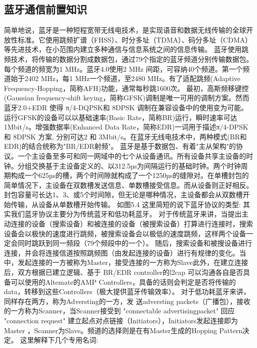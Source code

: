\subsection{蓝牙通信前置知识}
简单地说，蓝牙是一种短程宽带无线电技术，是实现语音和数据无线传输的全球开放性标准。它使用跳频扩谱（FHSS）、时分多址（TDMA）、码分多址（CDMA）等先进技术，在小范围内建立多种通信与信息系统之间的信息传输。
蓝牙使用跳频技术，将传输的数据分割成数据包，通过79个指定的蓝牙频道分别传输数据包。每个频道的频宽为1 MHz。蓝牙4.0使用2 MHz 间距，可容纳40个频道。第一个频道始于2402 MHz，每1 MHz一个频道，至2480 MHz。有了适配跳频(Adaptive Frequency-Hopping，简称AFH)功能，通常每秒跳1600次。
最初，高斯频移键控(Gaussian frequency-shift keying，简称GFSK)调制是唯一可用的调制方案。然而蓝牙2.0+EDR 使得 π/4-DQPSK和 8DPSK 调制在兼容设备中的使用变为可能。运行GFSK的设备可以以基础速率(Basic Rate，简称BR)运行，瞬时速率可达1Mbit/s。增强数据率(Enhanced Data Rate，简称EDR)一词用于描述π/4-DPSK 和 8DPSK 方案, 分别可达2 和 3Mbit/s。在蓝牙无线电技术中，两种模式(BR和EDR)的结合统称为"BR/EDR射频"。
蓝牙是基于数据包、有着"主从架构"的协议。一个主设备至多可和同一网域中的七个从设备通讯。所有设备共享主设备的时钟。分组交换基于主设备定义的、以312.5µs为间隔运行的基础时钟。两个时钟周期构成一个625µs的槽，两个时间隙就构成了一个1250µs的缝隙对。在单槽封包的简单情况下，主设备在双数槽发送信息、单数槽接受信息。而从设备则正好相反。封包容量可长达1、3、或5个时间隙，但无论是哪种情况，主设备都会从双数槽开始传输，从设备从单数槽开始传输。
如图5.4
这里简短的说下蓝牙协议的类型: 
其实我们蓝牙协议主要分为传统蓝牙和低功耗蓝牙。
对于传统蓝牙来讲，当提出主动连接的设备（搜索设备）和被连接的设备（被搜索设备）打算进行连接时，搜索设备会以极快的速度进行跳频，被搜索设备会以极低的速度跳频，这样两个设备一定会同时跳跃到同一频段（79个频段中的一个）。
随后，搜索设备和被搜设备进行连接，并会将连接信道按照跳频图（由发起连接的设备）进行有规律的变化。当中，发起连接的一方被称为Master，接受连接的一方称为Slave此外，在建立连接后，双方根据已建立逻辑、基于 BR/EDR controller的l2cap 可以沟通各自是否具备可以使用的Altemate的AMP Controllers，具备的话则会判定是否将传输的data，转移到这些Controllers（极大提供蓝牙传输效率）。
对于低功耗蓝牙来讲，同样存在两方，称为Adversting的一方，发 送adversting packets（广播包），接收的一方称为Scanner，当Scanner接受到 "connectable advertisingpacket" 回应 "connection request"  建立起点对点链接（Initiators），Initiators发起连接即为Master ，Scanner为Slave。频道的选择则是在有Master生成的Hopping Pattern决定。
这里解释下几个专用名词:
